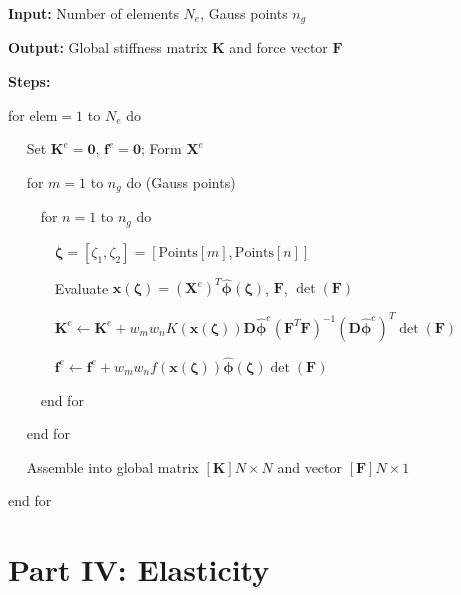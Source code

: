 \documentclass[
  11pt,
  a4paper,
]{scrbook}
\begin{document}
\begin{tcolorbox}[enhanced jigsaw, opacitybacktitle=0.6, leftrule=.75mm, colframe=quarto-callout-note-color-frame, toptitle=1mm, breakable, bottomtitle=1mm, opacityback=0, colback=white, rightrule=.15mm, colbacktitle=quarto-callout-note-color!10!white, arc=.35mm, left=2mm, toprule=.15mm, bottomrule=.15mm, titlerule=0mm, coltitle=black, title={Algorithm: 2D Finite Element Assembly}]

\textbf{Input:} Number of elements \(N_e\), Gauss points \(n_g\)

\textbf{Output:} Global stiffness matrix \(\mathbf{K}\) and force vector
\(\mathbf{F}\)

\textbf{Steps:}

for \(\text{elem} = 1\) to \(N_e\) do

\(\quad\) Set \(\mathbf{K}^e = \mathbf{0}\),
\(\mathbf{f}^e = \mathbf{0}\); Form \(\mathbf{X}^e\)

\(\quad\) for \(m = 1\) to \(n_g\) do (Gauss points)

\(\quad\quad\) for \(n = 1\) to \(n_g\) do

\(\quad\quad\quad\)
\(\boldsymbol{\zeta} = [\zeta_1, \zeta_2] = [\text{Points}[m], \text{Points}[n]]\)

\(\quad\quad\quad\) Evaluate
\(\mathbf{x}(\boldsymbol{\zeta}) = (\mathbf{X}^e)^T \hat{\boldsymbol{\phi}}(\boldsymbol{\zeta})\),
\(\mathbf{F}\), \(\det(\mathbf{F})\)

\(\quad\quad\quad\)
\(\mathbf{K}^e \leftarrow \mathbf{K}^e + w_m w_n K(\mathbf{x}(\boldsymbol{\zeta})) \mathbf{D}{\hat{\boldsymbol{\phi}}^e} (\mathbf{F}^T \mathbf{F})^{-1} (\mathbf{D}{\hat{\boldsymbol{\phi}}^e})^T \det(\mathbf{F})\)

\(\quad\quad\quad\)
\(\mathbf{f}^e \leftarrow \mathbf{f}^e + w_m w_n f(\mathbf{x}(\boldsymbol{\zeta})) \hat{\boldsymbol{\phi}}(\boldsymbol{\zeta}) \det(\mathbf{F})\)

\(\quad\quad\) end for

\(\quad\) end for

\(\quad\) Assemble into global matrix \([\mathbf{K}]{N \times N}\) and
vector \([\mathbf{F}]{N \times 1}\)

end for

\end{tcolorbox}

\part{Part IV: Elasticity}
\end{document}
